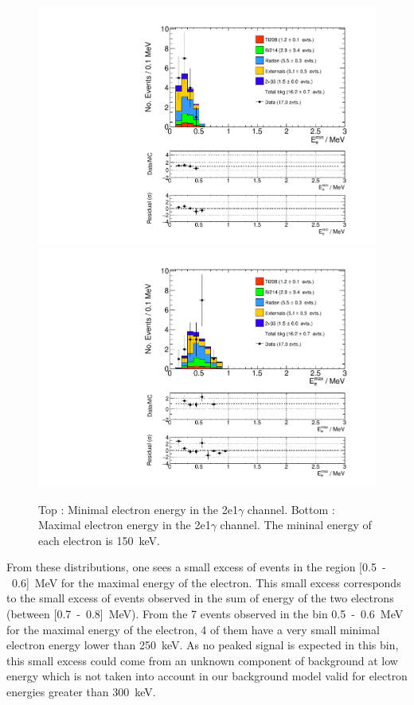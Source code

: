 \documentclass[main.tex]{subfiles}
\begin{document}
\begin{figure} [h!]
\begin{center}
\includegraphics[scale=0.5]{pictures/FinalResults/bb2nu2/150/Eemin_bb2nu2NS.pdf}
\includegraphics[scale=0.5]{pictures/FinalResults/bb2nu2/150/Eemax_bb2nu2NS.pdf}
\end{center}
\caption{Top : Minimal electron energy in the 2e1$\gamma$ channel. Bottom : Maximal electron energy in the 2e1$\gamma$ channel. The mininal energy of each electron is 150~keV.}
\label{plot:EeminAndEemax250bb2nu2_150}
\end{figure}


\FloatBarrier


\NI From these distributions, one sees a small excess of events in the region [0.5~-~0.6]~MeV for the maximal energy of the electron. This small excess corresponds to the small excess of events observed in the sum of energy of the two electrons (between [0.7~-~0.8]~MeV). From the 7 events observed in the bin 0.5~-~0.6~MeV for the maximal energy of the electron, 4 of them have a very small minimal electron energy lower than 250~keV. As no peaked signal is expected in this bin, this small excess could come from an unknown component of background at low energy which is not taken into account in our background model valid for electron energies greater than 300~keV. 
\end{document}
